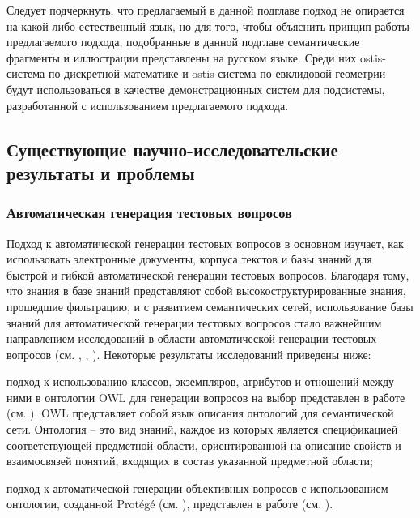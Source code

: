 Следует подчеркнуть, что предлагаемый в данной подглаве подход не опирается на какой-либо естественный язык, но для того, чтобы объяснить принцип работы предлагаемого подхода, подобранные в данной подглаве семантические фрагменты и иллюстрации представлены на русском языке. Среди них ostis-система по дискретной математике и ostis-система по евклидовой геометрии будут использоваться в качестве демонстрационных систем для подсистемы, разработанной с использованием предлагаемого подхода.

\subsection{Существующие научно-исследовательские результаты и проблемы}

\subsubsection{Автоматическая генерация тестовых вопросов}

Подход к автоматической генерации тестовых вопросов в основном изучает, как использовать электронные документы, корпуса текстов и базы знаний для быстрой и гибкой автоматической генерации тестовых вопросов. Благодаря тому, что знания в базе знаний представляют собой высокоструктурированные знания, прошедшие фильтрацию, и с развитием семантических сетей, использование базы знаний для автоматической генерации тестовых вопросов стало важнейшим направлением исследований в области автоматической генерации тестовых вопросов (см. , , ). Некоторые результаты исследований приведены ниже:

\begin{textitemize}
	\item подход к использованию классов, экземпляров, атрибутов и отношений между ними в онтологии OWL для генерации вопросов на выбор представлен в работе (см. ). OWL представляет собой язык описания онтологий для семантической сети. Онтология – это вид знаний, каждое из которых является спецификацией соответствующей предметной области, ориентированной на описание свойств и взаимосвязей понятий, входящих в состав указанной предметной области; 
	\item подход к автоматической генерации объективных вопросов с использованием онтологии, созданной Protégé (см. ), представлен в работе (см. ).
\end{textitemize}


